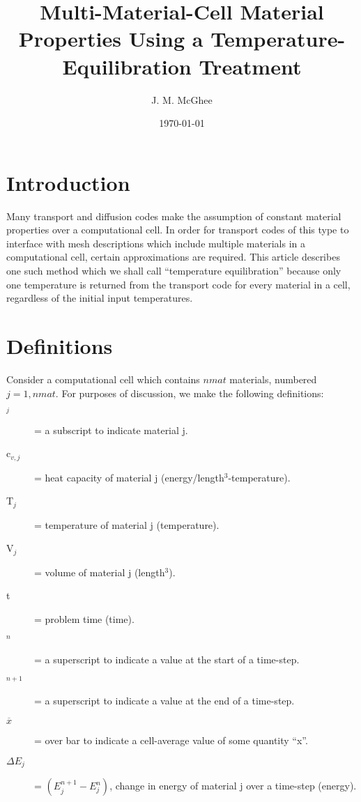\documentclass[12pt]{article}
\begin{document}
\title{Multi-Material-Cell Material Properties Using a
	Temperature-Equilibration Treatment}
\author{J. M. McGhee}
\date{\today}

\maketitle

\newpage

\section{Introduction}

Many transport and diffusion codes make the assumption of constant material
properties over a computational cell.  In order for transport codes
of this type to interface with mesh descriptions which include multiple
materials in a computational cell, certain approximations are required.
This article describes one such method which we shall call
``temperature equilibration'' because only one temperature is returned
from the transport code for every material in a cell, regardless of
the initial input temperatures.



\section{Definitions}

Consider a computational cell which contains $nmat$  materials, numbered
$j = 1,nmat$. For purposes
of discussion, we make the following definitions:

\begin{description}
\item[$_j$] = a subscript to indicate material j.
\item[c$_{v,j}$] = heat capacity of material j (energy/length$^3$-temperature).
\item[T$_j$] = temperature of material j (temperature).
\item[V$_j$] = volume of material j (length$^3$).
\item[t] = problem time (time).
\item[$^n$] = a superscript to indicate a value at the start of a time-step.
\item[$^{n+1}$] = a superscript to indicate a value at the end of a time-step.
\item[$\overline{x}$]=  over bar to indicate a cell-average value of some
 quantity ``x''.
\item[$\Delta E_{j}$] = $(E_{j}^{n+1} - E_{j}^{n})$, change in energy of 
	material j over a time-step (energy).
\end{description}
\end{document}

